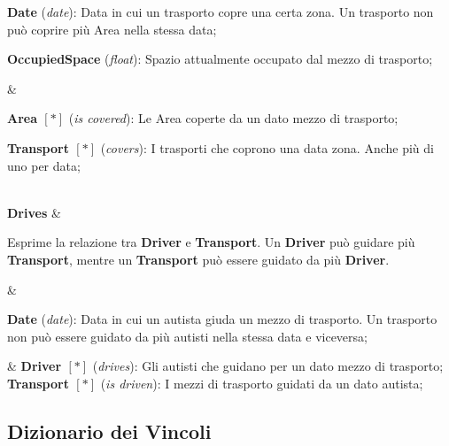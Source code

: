 {{  \textbf{Date} (\textit{date}): Data in cui un trasporto copre una certa zona. Un trasporto non può coprire più Area nella stessa data; 
  
  \textbf{OccupiedSpace} (\textit{float}): Spazio attualmente occupato dal mezzo di trasporto;

  } &
  {\footnotesize
  \textbf{Area \([*]\)} (\textit{is covered}): Le Area coperte da un dato mezzo di trasporto;

  \textbf{Transport \([*]\)} (\textit{covers}): I trasporti che coprono una data zona. Anche più di uno per data;
  }\\

  \textbf{Drives} &
  {\footnotesize
  Esprime la relazione tra \textbf{Driver} e \textbf{Transport}. Un \textbf{Driver} può guidare più \textbf{Transport}, mentre un \textbf{Transport} può essere guidato da più \textbf{Driver}.
  
  } &
  {\footnotesize

  \textbf{Date} (\textit{date}): Data in cui un autista giuda un mezzo di trasporto. Un trasporto non può essere guidato da più autisti nella stessa data e viceversa; 
  
  } &
  {\footnotesize
  \textbf{Driver \([*]\)} (\textit{drives}): Gli autisti che guidano per un dato mezzo di trasporto; 
  \textbf{Transport \([*]\)} (\textit{is driven}): I mezzi di trasporto guidati da un dato autista;
  }\\
}

\subsection{Dizionario dei Vincoli}\label{ConstraintDictionary}

